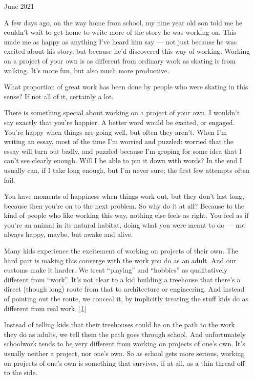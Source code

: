 June 2021

A few days ago, on the way home from school, my nine year old son told
me he couldn't wait to get home to write more of the story he was
working on. This made me as happy as anything I've heard him say --- not
just because he was excited about his story, but because he'd discovered
this way of working. Working on a project of your own is as different
from ordinary work as skating is from walking. It's more fun, but also
much more productive.

What proportion of great work has been done by people who were skating
in this sense? If not all of it, certainly a lot.

There is something special about working on a project of your own. I
wouldn't say exactly that you're happier. A better word would be
excited, or engaged. You're happy when things are going well, but often
they aren't. When I'm writing an essay, most of the time I'm worried and
puzzled: worried that the essay will turn out badly, and puzzled because
I'm groping for some idea that I can't see clearly enough. Will I be
able to pin it down with words? In the end I usually can, if I take long
enough, but I'm never sure; the first few attempts often fail.

You have moments of happiness when things work out, but they don't last
long, because then you're on to the next problem. So why do it at all?
Because to the kind of people who like working this way, nothing else
feels as right. You feel as if you're an animal in its natural habitat,
doing what you were meant to do --- not always happy, maybe, but awake
and alive.

Many kids experience the excitement of working on projects of their own.
The hard part is making this converge with the work you do as an adult.
And our customs make it harder. We treat ``playing'' and ``hobbies'' as
qualitatively different from ``work''. It's not clear to a kid building
a treehouse that there's a direct (though long) route from that to
architecture or engineering. And instead of pointing out the route, we
conceal it, by implicitly treating the stuff kids do as different from
real work. {[}\hyperref[f1n]{1}{]}

Instead of telling kids that their treehouses could be on the path to
the work they do as adults, we tell them the path goes through school.
And unfortunately schoolwork tends to be very different from working on
projects of one's own. It's usually neither a project, nor one's own. So
as school gets more serious, working on projects of one's own is
something that survives, if at all, as a thin thread off to the side.

